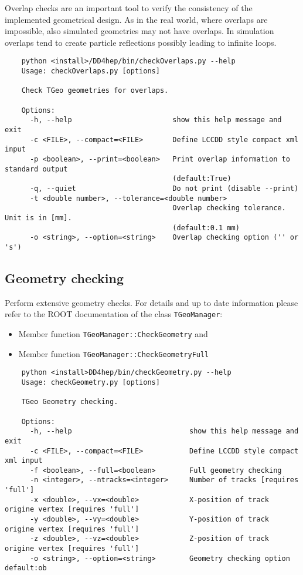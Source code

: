 Overlap checks are an important tool to verify the consistency of the  implemented geometrical design. As in the real world, where overlaps are  impossible, also simulated geometries may not have overlaps. In simulation overlaps tend to create particle reflections possibly leading to infinite loops.
\begin{verbatim}
    python <install>/DD4hep/bin/checkOverlaps.py --help
    Usage: checkOverlaps.py [options]

    Check TGeo geometries for overlaps.

    Options:
      -h, --help                        show this help message and exit
      -c <FILE>, --compact=<FILE>       Define LCCDD style compact xml input
      -p <boolean>, --print=<boolean>   Print overlap information to standard output
                                        (default:True)
      -q, --quiet                       Do not print (disable --print)
      -t <double number>, --tolerance=<double number>
                                        Overlap checking tolerance. Unit is in [mm].
                                        (default:0.1 mm)
      -o <string>, --option=<string>    Overlap checking option ('' or 's')
\end{verbatim}

\subsection{Geometry checking}
\label{sec:dd4hep-manual-geometry-checking}

Perform extensive geometry checks. For details and up to date information  please refer to the ROOT documentation of the class {\texttt{TGeoManager}}:
\begin{itemize}
\item Member function \texttt{TGeoManager::CheckGeometry} and 
\item Member function \texttt{TGeoManager::CheckGeometryFull}
\end{itemize}

\begin{verbatim}
    python <install>DD4hep/bin/checkGeometry.py --help
    Usage: checkGeometry.py [options]

    TGeo Geometry checking.

    Options:
      -h, --help                            show this help message and exit
      -c <FILE>, --compact=<FILE>           Define LCCDD style compact xml input
      -f <boolean>, --full=<boolean>        Full geometry checking
      -n <integer>, --ntracks=<integer>     Number of tracks [requires 'full']
      -x <double>, --vx=<double>            X-position of track origine vertex [requires 'full']
      -y <double>, --vy=<double>            Y-position of track origine vertex [requires 'full']
      -z <double>, --vz=<double>            Z-position of track origine vertex [requires 'full']
      -o <string>, --option=<string>        Geometry checking option default:ob
\end{verbatim}


